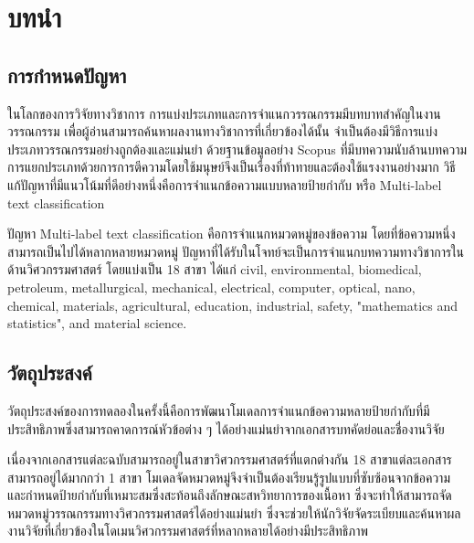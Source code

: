 \chapter{บทนำ}
\section{การกำหนดปัญหา}
ในโลกของการวิจัยทางวิชาการ
การแบ่งประเภทและการจำแนกวรรณกรรมมีบทบาทสำคัญในงานวรรณกรรม
เพื่อผู้อ่านสามารถค้นหาผลงานทางวิชาการที่เกี่ยวข้องได้นั้น 
จำเป็นต้องมีวิธีการแบ่งประเภทวรรณกรรมอย่างถูกต้องและแม่นยำ
ด้วยฐานข้อมูลอย่าง Scopus ที่มีบทความนับล้านบทความ
การแยกประเภทด้วยการการตีความโดยใช้มนุษย์จึงเป็นเรื่องที่ท้าทายและต้องใช้แรงงานอย่างมาก
วิธีแก้ปัญหาที่มีแนวโน้มที่ดีอย่างหนึ่งคือการจำแนกข้อความแบบหลายป้ายกำกับ หรือ Multi-label text classification

ปัญหา Multi-label text classification คือการจำแนกหมวดหมู่ของข้อความ โดยที่ข้อความหนึ่งสามารถเป็นไปได้หลากหลายหมวดหมู่ ปัญหาที่ได้รับในโจทย์จะเป็นการจำแนกบทความทางวิชาการในด้านวิศวกรรมศาสตร์ โดยแบ่งเป็น 18 สาขา ได้แก่ civil, environmental, biomedical, petroleum, metallurgical, mechanical, electrical, computer, optical, nano, chemical, materials, agricultural, education, industrial, safety, "mathematics and statistics", and material science.

\section{วัตถุประสงค์}
วัตถุประสงค์ของการทดลองในครั้งนี้คือการพัฒนาโมเดลการจำแนกข้อความหลายป้ายกำกับที่มีประสิทธิภาพซึ่งสามารถคาดการณ์หัวข้อต่าง ๆ ได้อย่างแม่นยำจากเอกสารบทคัดย่อและชื่องานวิจัย

เนื่องจากเอกสารแต่ละฉบับสามารถอยู่ในสาขาวิศวกรรมศาสตร์ที่แตกต่างกัน 18 สาขาแต่ละเอกสารสามารถอยู่ได้มากกว่า 1 สาขา โมเดลจัดหมวดหมู่จึงจำเป็นต้องเรียนรู้รูปแบบที่ซับซ้อนจากข้อความและกำหนดป้ายกำกับที่เหมาะสมซึ่งสะท้อนถึงลักษณะสหวิทยาการของเนื้อหา ซึ่งจะทำให้สามารถจัดหมวดหมู่วรรณกรรมทางวิศวกรรมศาสตร์ได้อย่างแม่นยำ ซึ่งจะช่วยให้นักวิจัยจัดระเบียบและค้นหาผลงานวิจัยที่เกี่ยวข้องในโดเมนวิศวกรรมศาสตร์ที่หลากหลายได้อย่างมีประสิทธิภาพ